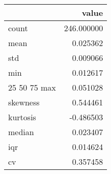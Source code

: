 \begin{tabular}{lr}
\toprule
 & value \\
\midrule
count & 246.000000 \\
mean & 0.025362 \\
std & 0.009066 \\
min & 0.012617 \\
25%
50%
75%
max & 0.051028 \\
skewness & 0.544461 \\
kurtosis & -0.486503 \\
median & 0.023407 \\
iqr & 0.014624 \\
cv & 0.357458 \\
\bottomrule
\end{tabular}
